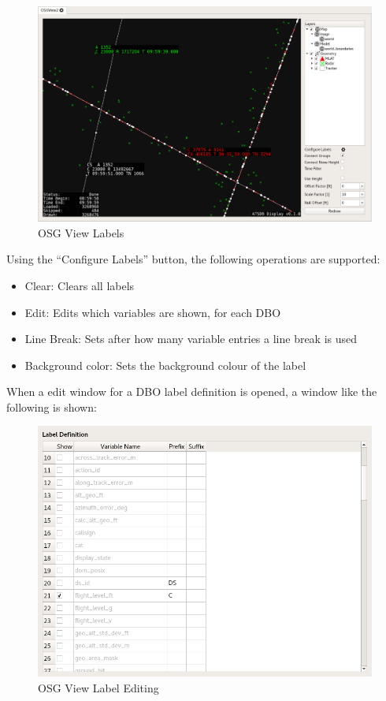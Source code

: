 {\begin{figure}[H]
    \hspace*{-2cm}
    \includegraphics[width=18cm,frame]{../screenshots/osgview_labels.png}
  \caption{OSG View Labels}
\end{figure}

Using the ``Configure Labels'' button, the following operations are supported:

\begin{itemize}
 \item Clear: Clears all labels
 \item Edit: Edits which variables are shown, for each DBO
 \item Line Break: Sets after how many variable entries a line break is used
 \item Background color: Sets the background colour of the label
\end{itemize}

When a edit window for a DBO label definition is opened, a window like the following is shown:

\begin{figure}[H]
    \includegraphics[width=12cm,frame]{../screenshots/osgview_label_edit.png}
  \caption{OSG View Label Editing}
\end{figure}

}
